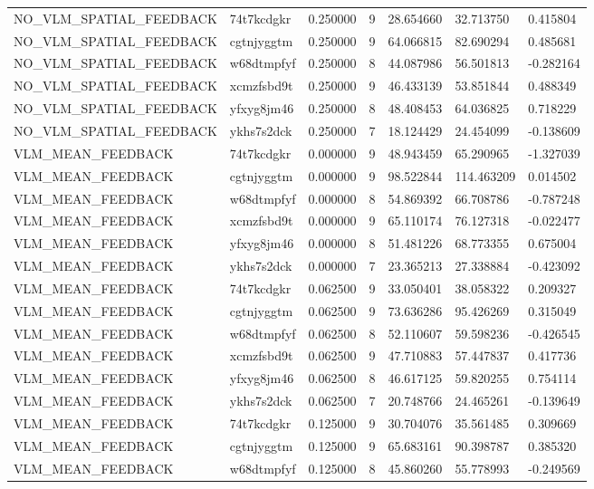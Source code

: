 \begin{tabular}{lllllll}
NO\_VLM\_SPATIAL\_FEEDBACK & 74t7kcdgkr & 0.250000 & 9 & 28.654660 & 32.713750 & 0.415804 \\
NO\_VLM\_SPATIAL\_FEEDBACK & cgtnjyggtm & 0.250000 & 9 & 64.066815 & 82.690294 & 0.485681 \\
NO\_VLM\_SPATIAL\_FEEDBACK & w68dtmpfyf & 0.250000 & 8 & 44.087986 & 56.501813 & -0.282164 \\
NO\_VLM\_SPATIAL\_FEEDBACK & xcmzfsbd9t & 0.250000 & 9 & 46.433139 & 53.851844 & 0.488349 \\
NO\_VLM\_SPATIAL\_FEEDBACK & yfxyg8jm46 & 0.250000 & 8 & 48.408453 & 64.036825 & 0.718229 \\
NO\_VLM\_SPATIAL\_FEEDBACK & ykhs7s2dck & 0.250000 & 7 & 18.124429 & 24.454099 & -0.138609 \\
VLM\_MEAN\_FEEDBACK & 74t7kcdgkr & 0.000000 & 9 & 48.943459 & 65.290965 & -1.327039 \\
VLM\_MEAN\_FEEDBACK & cgtnjyggtm & 0.000000 & 9 & 98.522844 & 114.463209 & 0.014502 \\
VLM\_MEAN\_FEEDBACK & w68dtmpfyf & 0.000000 & 8 & 54.869392 & 66.708786 & -0.787248 \\
VLM\_MEAN\_FEEDBACK & xcmzfsbd9t & 0.000000 & 9 & 65.110174 & 76.127318 & -0.022477 \\
VLM\_MEAN\_FEEDBACK & yfxyg8jm46 & 0.000000 & 8 & 51.481226 & 68.773355 & 0.675004 \\
VLM\_MEAN\_FEEDBACK & ykhs7s2dck & 0.000000 & 7 & 23.365213 & 27.338884 & -0.423092 \\
VLM\_MEAN\_FEEDBACK & 74t7kcdgkr & 0.062500 & 9 & 33.050401 & 38.058322 & 0.209327 \\
VLM\_MEAN\_FEEDBACK & cgtnjyggtm & 0.062500 & 9 & 73.636286 & 95.426269 & 0.315049 \\
VLM\_MEAN\_FEEDBACK & w68dtmpfyf & 0.062500 & 8 & 52.110607 & 59.598236 & -0.426545 \\
VLM\_MEAN\_FEEDBACK & xcmzfsbd9t & 0.062500 & 9 & 47.710883 & 57.447837 & 0.417736 \\
VLM\_MEAN\_FEEDBACK & yfxyg8jm46 & 0.062500 & 8 & 46.617125 & 59.820255 & 0.754114 \\
VLM\_MEAN\_FEEDBACK & ykhs7s2dck & 0.062500 & 7 & 20.748766 & 24.465261 & -0.139649 \\
VLM\_MEAN\_FEEDBACK & 74t7kcdgkr & 0.125000 & 9 & 30.704076 & 35.561485 & 0.309669 \\
VLM\_MEAN\_FEEDBACK & cgtnjyggtm & 0.125000 & 9 & 65.683161 & 90.398787 & 0.385320 \\
VLM\_MEAN\_FEEDBACK & w68dtmpfyf & 0.125000 & 8 & 45.860260 & 55.778993 & -0.249569 \\

\end{tabular}
